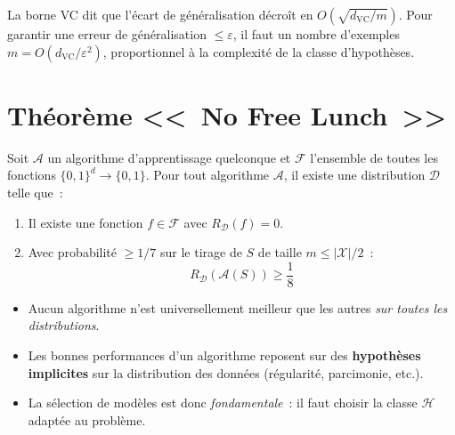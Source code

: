 \begin{intuition}[title=\textbf{Interpr\'etation de la borne VC}]
La borne VC dit que l'\'ecart de g\'en\'eralisation d\'ecro\^it en
$O\!\left(\sqrt{d_{\text{VC}} / m}\right)$. Pour garantir une erreur
de g\'en\'eralisation $\leq \varepsilon$, il faut un nombre d'exemples
$m = O(d_{\text{VC}} / \varepsilon^2)$, proportionnel \`a la complexit\'e
de la classe d'hypoth\`eses.
\end{intuition}

\section{Th\'eor\`eme <<~No Free Lunch~>>}
\label{sec:nfl}

\begin{theoreme}
\label{thm:nfl}
Soit $\mathcal{A}$ un algorithme d'apprentissage quelconque et
$\mathcal{F}$ l'ensemble de toutes les fonctions $\{0,1\}^d \to \{0,1\}$.
Pour tout algorithme $\mathcal{A}$, il existe une distribution
$\mathcal{D}$ telle que~:
\begin{enumerate}
  \item Il existe une fonction $f \in \mathcal{F}$ avec $R_{\mathcal{D}}(f) = 0$.
  \item Avec probabilit\'e $\geq 1/7$ sur le tirage de $S$ de taille $m \leq |\mathcal{X}|/2$~:
    \begin{equation}
      R_{\mathcal{D}}(\mathcal{A}(S)) \geq \frac{1}{8}
    \end{equation}
\end{enumerate}
\end{theoreme}

\begin{attention}[title=\textbf{Cons\'equences du No Free Lunch}]
\begin{itemize}
  \item Aucun algorithme n'est universellement meilleur que les autres
    \emph{sur toutes les distributions}.
  \item Les bonnes performances d'un algorithme reposent sur des
    \textbf{hypoth\`eses implicites} sur la distribution des donn\'ees
    (r\'egularit\'e, parcimonie, etc.).
  \item La s\'election de mod\`eles est donc \emph{fondamentale}~: il faut
    choisir la classe $\mathcal{H}$ adapt\'ee au probl\`eme.
\end{itemize}
\end{attention}

